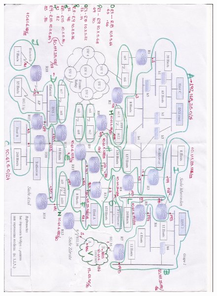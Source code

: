 \begin{figure}[!htpb]
      \centering
      \begin{center}
      \includegraphics[width=13cm]{Imagenes/red.jpg}
      \end{center}
      \label{fig001}
\end{figure}

